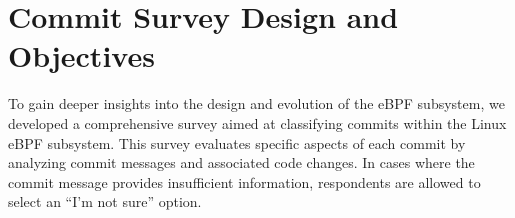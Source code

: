 \documentclass[sigconf,review,anonymous]{acmart}
\begin{document}


 


 




 


 


 

 




 







\appendix

\section{Commit Survey Design and Objectives}
\label{sec:appendix:survey}

To gain deeper insights into the design and evolution of the eBPF subsystem, we developed a comprehensive survey aimed at classifying commits within the Linux eBPF subsystem. This survey evaluates specific aspects of each commit by analyzing commit messages and associated code changes. In cases where the commit message provides insufficient information, respondents are allowed to select an ``I'm not sure'' option.
\end{document}
